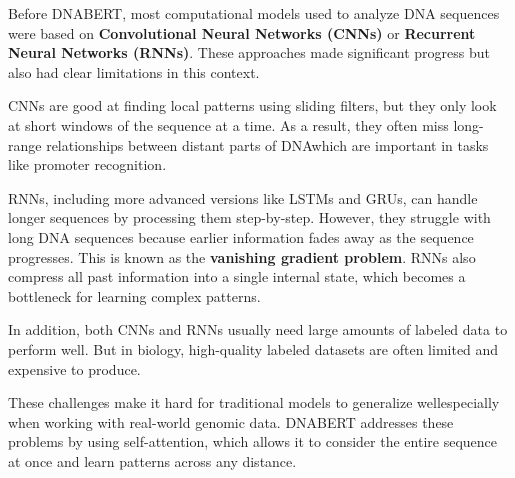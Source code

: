 Before DNABERT, most computational models used to analyze DNA sequences were based on \textbf{Convolutional Neural Networks (CNNs)} or \textbf{Recurrent Neural Networks (RNNs)}. These approaches made significant progress but also had clear limitations in this context.

CNNs are good at finding local patterns using sliding filters, but they only look at short windows of the sequence at a time. As a result, they often miss long-range relationships between distant parts of DNA\textemdash which are important in tasks like promoter recognition.

RNNs, including more advanced versions like LSTMs and GRUs, can handle longer sequences by processing them step-by-step. However, they struggle with long DNA sequences because earlier information fades away as the sequence progresses. This is known as the \textbf{vanishing gradient problem}. RNNs also compress all past information into a single internal state, which becomes a bottleneck for learning complex patterns.

In addition, both CNNs and RNNs usually need large amounts of labeled data to perform well. But in biology, high-quality labeled datasets are often limited and expensive to produce.

These challenges make it hard for traditional models to generalize well\textemdash especially when working with real-world genomic data. DNABERT addresses these problems by using self-attention, which allows it to consider the entire sequence at once and learn patterns across any distance.
